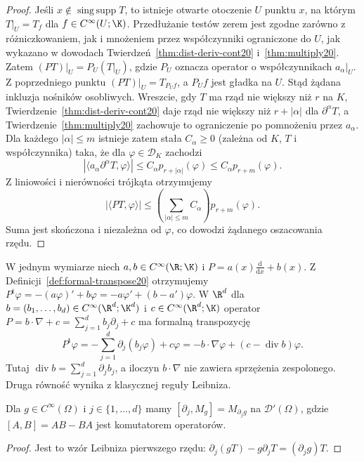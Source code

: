 \begin{proof}
Jeśli $x\notin\operatorname{sing\,supp}T$, to istnieje
otwarte otoczenie $U$ punktu $x$, na którym $T|_U=T_f$
dla $f\in C^\infty(U;\K)$.
Przedłużanie testów zerem jest zgodne zarówno
z różniczkowaniem, jak i mnożeniem przez współczynniki
ograniczone do $U$, jak wykazano w dowodach
Twierdzeń~\ref{thm:dist-deriv-cont20}
i~\ref{thm:multiply20}.
Zatem $(PT)|_U=P_U(T|_U)$, gdzie $P_U$ oznacza
operator o współczynnikach $a_\alpha|_U$.
Z poprzedniego punktu $(PT)|_U=T_{P_U f}$,
a $P_U f$ jest gładka na $U$.
Stąd żądana inkluzja nośników osobliwych.
Wreszcie, gdy $T$ ma rząd nie większy niż $r$ na $K$,
Twierdzenie~\ref{thm:dist-deriv-cont20} daje rząd
nie większy niż $r+|\alpha|$ dla $\partial^\alpha T$,
a Twierdzenie~\ref{thm:multiply20} zachowuje to
ograniczenie po pomnożeniu przez $a_\alpha$.
Dla każdego $|\alpha|\le m$ istnieje zatem stała
$C_\alpha\ge0$ (zależna od $K$, $T$ i współczynnika)
taka, że dla $\varphi\in\mathcal D_K$ zachodzi
\[
 |\langle a_\alpha\partial^\alpha T,\varphi\rangle|
 \le C_\alpha p_{r+|\alpha|}(\varphi)
 \le C_\alpha p_{r+m}(\varphi).
\]
Z liniowości i nierówności trójkąta otrzymujemy
\[
 |\langle PT,\varphi\rangle|
 \le \left(\sum_{|\alpha|\le m} C_\alpha\right)
 p_{r+m}(\varphi).
\]
Suma jest skończona i niezależna od $\varphi$,
co dowodzi żądanego oszacowania rzędu.
\end{proof}

\begin{przyklad}
\label{ex:first-order-P20}
W jednym wymiarze niech $a,b\in C^\infty(\R;\K)$
i $P=a(x)\frac{\mathrm d}{\mathrm dx}+b(x)$.
Z Definicji~\ref{def:formal-transpose20} otrzymujemy
$P^{\mathrm t}\varphi=-(a\varphi)'+b\varphi
=-a\varphi'+(b-a')\varphi$.
W $\R^d$ dla $b=(b_1,\ldots,b_d)\in C^\infty(\R^d;\K^d)$
i $c\in C^\infty(\R^d;\K)$ operator
$P=b\cdot\nabla+c=\sum_{j=1}^d b_j\partial_j+c$
ma formalną transpozycję
\[
P^{\mathrm t}\varphi=-\sum_{j=1}^d\partial_j(b_j\varphi)
+c\varphi=-b\cdot\nabla\varphi+(c-\operatorname{div}b)\varphi.
\]
Tutaj $\operatorname{div}b=\sum_{j=1}^d\partial_j b_j$,
a iloczyn $b\cdot\nabla$ nie zawiera sprzężenia zespolonego.
Druga równość wynika z klasycznej reguły Leibniza.
\end{przyklad}

\begin{wniosek}
\label{cor:commutator20}
Dla $g\in C^\infty(\Omega)$ i $j\in\{1,\ldots,d\}$ mamy
$[\partial_j,M_g]=M_{\partial_jg}$ na $\mathcal D'(\Omega)$,
gdzie $[A,B]=AB-BA$ jest komutatorem operatorów.
\end{wniosek}
\begin{proof}
Jest to wzór Leibniza pierwszego rzędu:
$\partial_j(gT)-g\partial_jT=(\partial_jg)T$.
\end{proof}

